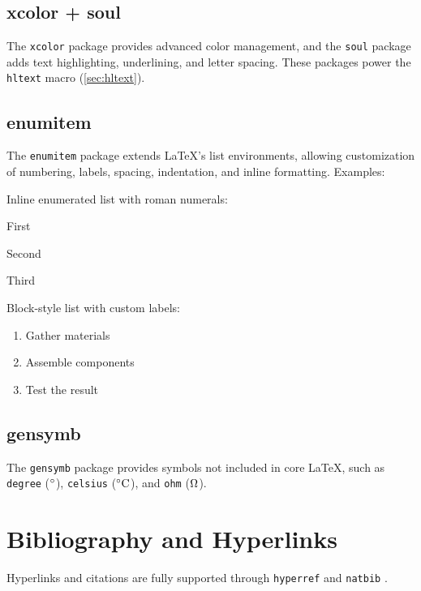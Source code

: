 \documentclass{lecturenotes}
\begin{document}
\subsection{xcolor + soul}
The \texttt{xcolor} package \cite{ctan:xcolor} provides advanced color management, and the \texttt{soul} package \cite{ctan:soul} adds text highlighting, underlining, and letter spacing. These packages power the \texttt{hltext} macro (\ref{sec:hltext}).


\subsection{enumitem}
The \texttt{enumitem} package \cite{ctan:enumitem} extends \LaTeX's list environments, allowing customization of numbering, labels, spacing, indentation, and inline formatting. Examples:

Inline enumerated list with roman numerals:
\begin{enumerate*}[label=(\roman*)]
\item First
\item Second
\item Third
\end{enumerate*}

Block-style list with custom labels:
\begin{enumerate}[label=\textbf{Step \arabic*:}]
    \item Gather materials
    \item Assemble components
    \item Test the result
\end{enumerate}


\subsection{gensymb}
The \texttt{gensymb} package \cite{ctan:gensymb} provides symbols not included in core \LaTeX, such as \texttt{degree} ($\degree$), \texttt{celsius} ($\celsius$), and \texttt{ohm} ($\ohm$).



\newpage
\section{Bibliography and Hyperlinks}

Hyperlinks and citations are fully supported through \texttt{hyperref} \cite{ctan:hyperref} and \texttt{natbib} \cite{ctan:natbib}.
\end{document}
